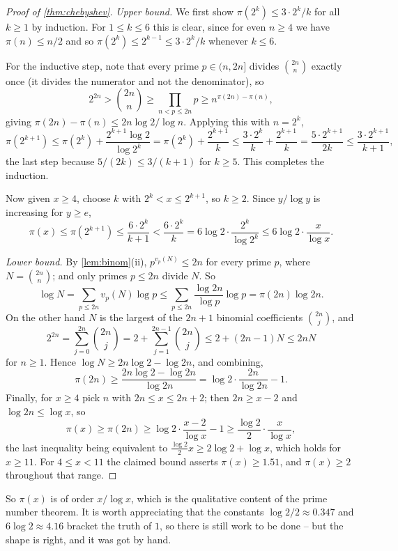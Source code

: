 \documentclass[a4paper]{scrartcl}
\begin{document}
\begin{proof}[Proof of \autoref{thm:chebyshev}]
	\emph{Upper bound.} We first show $\pi(2^k) \leq 3 \cdot 2^k/k$ for all $k \geq 1$ by induction. For $1 \leq k \leq 6$ this is clear, since for even $n \geq 4$ we have $\pi(n) \leq n/2$ and so $\pi(2^k) \leq 2^{k-1} \leq 3\cdot2^k/k$ whenever $k \leq 6$.

	For the inductive step, note that every prime $p \in (n, 2n]$ divides $\binom{2n}n$ exactly once (it divides the numerator and not the denominator), so
	$$
	2^{2n} > \binom{2n}n \geq \prod_{n < p \leq 2n}p \geq n^{\pi(2n) - \pi(n)},
	$$
	giving $\pi(2n) - \pi(n) \leq 2n\log 2/\log n$. Applying this with $n = 2^k$,
	$$
	\pi(2^{k+1}) \leq \pi(2^k) + \frac{2^{k+1}\log 2}{\log 2^k} = \pi(2^k) + \frac{2^{k+1}}k \leq \frac{3\cdot2^k}k + \frac{2^{k+1}}k = \frac{5\cdot 2^{k+1}}{2k} \leq \frac{3\cdot2^{k+1}}{k+1},
	$$
	the last step because $5/(2k) \leq 3/(k+1)$ for $k \geq 5$. This completes the induction.

	Now given $x \geq 4$, choose $k$ with $2^k < x \leq 2^{k+1}$, so $k \geq 2$. Since $y/\log y$ is increasing for $y \geq e$,
	$$
	\pi(x) \leq \pi(2^{k+1}) \leq \frac{6 \cdot 2^k}{k+1} < \frac{6\cdot 2^k}{k} = 6\log 2\cdot\frac{2^k}{\log 2^k} \leq 6\log 2\cdot\frac{x}{\log x}.
	$$

	\emph{Lower bound.} By \autoref{lem:binom}(ii), $p^{v_p(N)} \leq 2n$ for every prime $p$, where $N = \binom{2n}n$; and only primes $p \leq 2n$ divide $N$. So
	$$
	\log N = \sum_{p \leq 2n}v_p(N)\log p \leq \sum_{p \leq 2n}\frac{\log 2n}{\log p}\log p = \pi(2n)\log 2n.
	$$
	On the other hand $N$ is the largest of the $2n+1$ binomial coefficients $\binom{2n}j$, and
	$$
	2^{2n} = \sum_{j=0}^{2n}\binom{2n}j = 2 + \sum_{j=1}^{2n-1}\binom{2n}j \leq 2 + (2n-1)N \leq 2nN
	$$
	for $n \geq 1$. Hence $\log N \geq 2n\log 2 - \log 2n$, and combining,
	$$
	\pi(2n) \geq \frac{2n\log 2 - \log 2n}{\log 2n} = \log 2\cdot\frac{2n}{\log 2n} - 1.
	$$
	Finally, for $x \geq 4$ pick $n$ with $2n \leq x \leq 2n+2$; then $2n \geq x - 2$ and $\log 2n \leq \log x$, so
	$$
	\pi(x) \geq \pi(2n) \geq \log 2\cdot\frac{x-2}{\log x} - 1 \geq \frac{\log 2}2\cdot\frac x{\log x},
	$$
	the last inequality being equivalent to $\frac{\log 2}2 x \geq 2\log 2 + \log x$, which holds for $x \geq 11$. For $4 \leq x < 11$ the claimed bound asserts $\pi(x) \geq 1.51$, and $\pi(x) \geq 2$ throughout that range.
\end{proof}

So $\pi(x)$ is of order $x/\log x$, which is the qualitative content of the prime number theorem. It is worth appreciating that the constants $\log 2/2 \approx 0.347$ and $6\log 2 \approx 4.16$ bracket the truth of $1$, so there is still work to be done -- but the shape is right, and it was got by hand.
\end{document}
